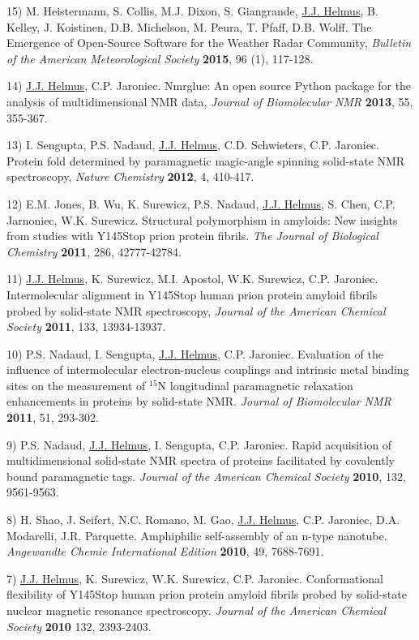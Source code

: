 \documentclass[margin,line]{res}
\begin{document}
\begin{resume}
15) M. Heistermann, S. Collis, M.J. Dixon, S. Giangrande,
\underline{J.J.  Helmus}, B. Kelley, J. Koistinen, D.B. Michelson, M. Peura,
T. Pfaff, D.B. Wolff.
The Emergence of Open-Source Software for the Weather Radar Community,
{\em Bulletin of the American Meteorological Society} {\bf 2015}, 96 (1), 117-128.

14) \underline{J.J. Helmus}, C.P. Jaroniec.
Nmrglue: An open source Python package for the analysis of multidimensional NMR data,
{\em Journal of Biomolecular NMR} {\bf 2013}, 55, 355-367.

13) I. Sengupta, P.S. Nadaud, \underline{J.J. Helmus}, C.D. Schwieters, C.P. Jaroniec.
Protein fold determined by paramagnetic magic-angle spinning solid-state NMR spectroscopy,
{\em Nature Chemistry} {\bf 2012}, 4, 410-417.

12) E.M. Jones, B. Wu, K. Surewicz, P.S. Nadaud, \underline{J.J. Helmus}, S. Chen,
C.P. Jarnoniec, W.K. Surewicz.
Structural polymorphism in amyloids: New insights from studies with Y145Stop prion protein fibrils.
{\em The Journal of Biological Chemistry} {\bf 2011}, 286, 42777-42784.

11) \underline{J.J. Helmus}, K. Surewicz, M.I. Apostol, W.K. Surewicz, C.P. Jaroniec.
Intermolecular alignment in Y145Stop human prion protein amyloid fibrils probed by solid-state
NMR spectroscopy,
{\em Journal of the American Chemical Society} {\bf 2011}, 133, 13934-13937.

10) P.S. Nadaud, I. Sengupta, \underline{J.J. Helmus}, C.P. Jaroniec.
Evaluation of the influence of intermolecular electron-nucleus couplings and intrinsic metal
binding sites on the measurement of $^{15}$N longitudinal paramagnetic relaxation enhancements
in proteins by solid-state NMR.
{\em Journal of Biomolecular NMR} {\bf 2011}, 51, 293-302.

9) P.S. Nadaud, \underline{J.J. Helmus}, I. Sengupta, C.P. Jaroniec.
Rapid acquisition of multidimensional solid-state NMR spectra of proteins facilitated by
covalently bound paramagnetic tags.
{\em Journal of the American Chemical Society} {\bf 2010}, 132, 9561-9563.

8) H. Shao, J. Seifert, N.C. Romano, M. Gao, \underline{J.J. Helmus}, C.P. Jaroniec,
D.A. Modarelli, J.R. Parquette.
Amphiphilic self-assembly of an n-type nanotube.
{\em Angewandte Chemie International Edition} {\bf 2010}, 49, 7688-7691.

7) \underline{J.J. Helmus}, K. Surewicz, W.K. Surewicz, C.P. Jaroniec.
Conformational flexibility of Y145Stop human prion protein amyloid fibrils probed by
solid-state nuclear magnetic resonance spectroscopy.
{\em Journal of the American Chemical Society} {\bf 2010} 132, 2393-2403.


\end{resume}
\end{document}
